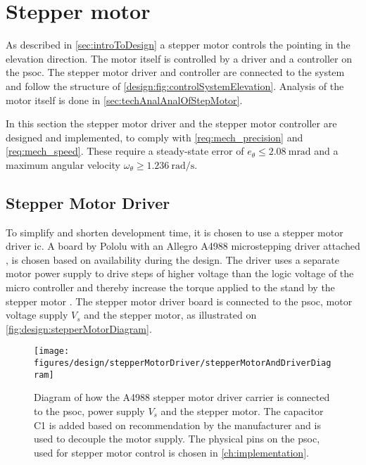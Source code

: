 \newpage
\section{Stepper motor}\label{sec:stepperMotor}
As described in \autoref{sec:introToDesign} a stepper motor controls the pointing in the elevation direction. The motor itself is controlled by a driver and a controller on the \gls{psoc}. The stepper motor driver and controller are connected to the system and follow the structure of \autoref{design:fig:controlSystemElevation}. Analysis of the motor itself is done in \autoref{sec:techAnalAnalOfStepMotor}.

In this section the stepper motor driver and the stepper motor controller are designed and implemented, to comply with \autoref{req:mech_precision} and \autoref{req:mech_speed}. These require a steady-state error of $e_{\theta} \leq \SI{2.08}{\milli\radian}$ and a maximum angular velocity $\omega_\theta \geq \SI{1.236}{\radian\per\second}$.

\subsection{Stepper Motor Driver}\label{sec:StepperMotorDriver}
To simplify and shorten development time, it is chosen to use a stepper motor driver \gls{ic}. A board by Pololu with an Allegro A4988 microstepping driver attached \cite{datasheet:pololu_a4988}, is chosen based on availability during the design. The driver uses a separate motor power supply to drive steps of higher voltage than the logic voltage of the micro controller and thereby increase the torque applied to the stand by the stepper motor \citep{datasheet:a4988}. The stepper motor driver board is connected to the \gls{psoc}, motor voltage supply $V_s$ and the stepper motor, as illustrated on \autoref{fig:design:stepperMotorDiagram}.

\begin{figure}[h]
	\centering
	\texttt{[image: figures/design/stepperMotorDriver/stepperMotorAndDriverDiagram]}
	\caption{Diagram of how the A4988 stepper motor driver carrier is connected to the \gls{psoc}, power supply $V_s$ and the stepper motor. The capacitor C1 is added based on recommendation by the manufacturer \cite{datasheet:pololu_a4988} and is used to decouple the motor supply. The physical pins on the \gls{psoc}, used for stepper motor control is chosen in \autoref{ch:implementation}.} \label{fig:design:stepperMotorDiagram}
\end{figure}
		
